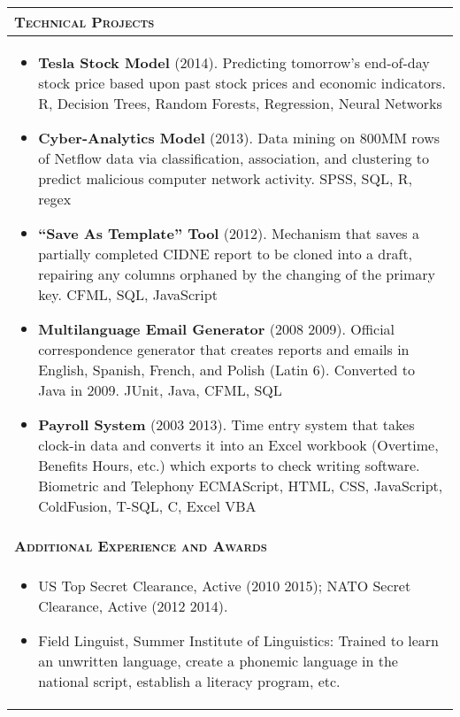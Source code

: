 \documentclass{scrbook}
\begin{document}
\begin{table}
\begin{tabularx}{\textwidth}{|
p{}|
p{}|
p{}|} \hline 
\multicolumn{3}{|p{\dimexpr 1.001\linewidth-2\tabcolsep-2\arrayrulewidth}|}{\textsc{\textbf{Technical Projects}}} &\\\hline 
\multicolumn{3}{|p{\dimexpr 1.001\linewidth-2\tabcolsep-2\arrayrulewidth}|}{
\begin{itemize}
\item \textbf{Tesla Stock Model} (2014). Predicting tomorrow's end-of-day stock price based upon past stock prices and economic indicators. R, Decision Trees, Random Forests, Regression, Neural Networks
\item \textbf{Cyber-Analytics Model} (2013). Data mining on 800MM rows of Netflow data via classification, association, and clustering to predict malicious computer network activity.  SPSS, SQL, R, regex 
\item \textbf{``Save As Template'' Tool} (2012). Mechanism that saves a partially completed CIDNE report to be cloned into a draft, repairing any columns orphaned by the changing of the primary key.  CFML, SQL, JavaScript 
\item \textbf{Multilanguage Email Generator} (2008 \textendash{} 2009). Official correspondence generator that creates reports and emails in English, Spanish, French, and Polish (Latin 6). Converted to Java in 2009. JUnit,  Java, CFML, SQL 
\item \textbf{Payroll System} (2003 \textendash{} 2013).  Time entry system that takes clock-in data and converts it into an Excel workbook (Overtime, Benefits Hours, etc.) which exports to check writing software.  Biometric and Telephony ECMAScript, HTML, CSS, JavaScript, ColdFusion, T-SQL, C, Excel VBA 
\end{itemize}
} &\\\hline 
\multicolumn{3}{|p{\dimexpr 1.001\linewidth-2\tabcolsep-2\arrayrulewidth}|}{\textsc{\textbf{Additional Experience and Awards}}} &\\\hline 
\multicolumn{3}{|p{\dimexpr 1.001\linewidth-2\tabcolsep-2\arrayrulewidth}|}{
\begin{itemize}
\item US Top Secret Clearance, Active (2010 \textendash{} 2015); NATO Secret Clearance, Active (2012 \textendash{} 2014). 
\item Field Linguist, Summer Institute of Linguistics: Trained to learn an unwritten language, create a phonemic language in the national script, establish a literacy program, etc.

\end{itemize}}
\end{tabularx}
\end{table}
\end{document}
